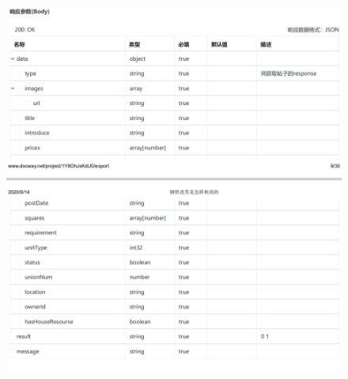         \begin{figure}[h]
            \centering
            \includegraphics[height=19.0cm,width=14.0cm]{design/image/api9.png} 
            \end{figure}  
            \newpage   
